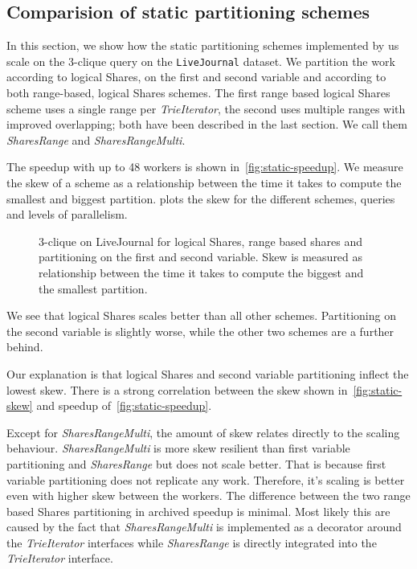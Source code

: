 
\subsection{Comparision of static partitioning schemes} \label{subsec:statical-partitioning-experiment}
In this section, we show how the static partitioning schemes implemented by us scale on the 3-clique query on the
\texttt{LiveJournal} dataset.
We partition the work according to logical Shares, on the first and second variable and according to both range-based, logical Shares schemes.
The first range based logical Shares scheme uses a single range per \textit{TrieIterator}, the second uses multiple ranges with improved
overlapping;
both have been described in the last section.
We call them \textit{SharesRange} and \textit{SharesRangeMulti}.

The speedup with up to 48 workers is shown in~\cref{fig:static-speedup}.
We measure the skew of a scheme as a relationship between the time it takes to compute the smallest and biggest partition.
 plots the skew for the different schemes, queries and levels of parallelism.

\begin{figure}
\caption{3-clique on LiveJournal for logical Shares, range based shares and partitioning on the first and second variable.
Skew is measured as relationship between the time it takes to compute the biggest and the smallest partition.
}
\end{figure}

We see that logical Shares scales better than all other schemes.
Partitioning on the second variable is slightly worse, while the other two schemes are a further behind.

Our explanation is that logical Shares and second variable partitioning inflect the lowest skew.
There is a strong correlation between the skew shown in~\cref{fig:static-skew} and speedup of~\cref{fig:static-speedup}.

Except for \textit{SharesRangeMulti}, the amount of skew relates directly to the scaling behaviour.
\textit{SharesRangeMulti} is more skew resilient than first variable partitioning and \textit{SharesRange} but does not scale
better.
That is because first variable partitioning does not replicate any work.
Therefore, it's scaling is better even with higher skew between the workers.
The difference between the two range based Shares partitioning in archived speedup is minimal.
Most likely this are caused by the fact that \textit{SharesRangeMulti} is implemented as a decorator around the
\textit{TrieIterator} interfaces while \textit{SharesRange} is directly integrated into the \textit{TrieIterator} interface.

